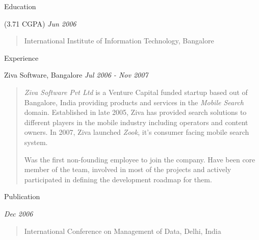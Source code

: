 \documentclass{resume}
\author{Siddhartha Reddy Kothakapu}
\newcommand{\period}{\hfill\small\sl}
\begin{document}
\maketitle

\begin{category}{Education}

     {\footnotesize(3.71 CGPA)} {\period Jun 2006}
    \begin{quote}
        International Institute of Information Technology, Bangalore
    \end{quote}

\end{category}


\begin{category}{Experience}

     Ziva Software, Bangalore {\period Jul 2006 - Nov 2007}
    \begin{quotation}
        {\em Ziva Software Pvt Ltd} is a Venture Capital funded startup based out of Bangalore, India providing products and services in the {\em Mobile Search} domain. Established in late 2005, Ziva has provided search solutions to different players in the mobile industry including operators and content owners. In 2007, Ziva launched {\em Zook}, it's consumer facing mobile search system.

        Was the first non-founding employee to join the company. Have been core member of the team, involved in most of the projects and actively participated in defining the development roadmap for them. %
    \end{quotation}

\end{category}


\begin{category}{Publication}

     {\period Dec 2006}
    \begin{quote}
        International Conference on Management of Data, Delhi, India
    \end{quote}

\end{category}
\end{document}
